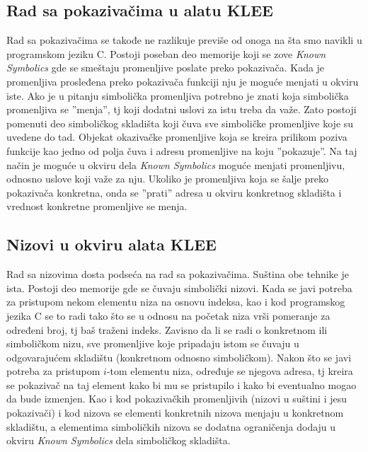 \documentclass[12pt]{article}
\begin{document}
\subsection{Rad sa pokazivačima u alatu KLEE}
Rad sa pokazivačima se takođe ne razlikuje previše od onoga na šta smo navikli u programskom jeziku C. Postoji poseban deo memorije koji se zove \textit{Known Symbolics} gde se smeštaju promenljive poslate preko pokazivača. Kada je promenljiva prosleđena preko pokazivača funkciji nju je moguće menjati u okviru iste. Ako je u pitanju simbolička promenljiva potrebno je znati koja simbolička promenljiva se ''menja'', tj koji dodatni uslovi za istu treba da važe. Zato postoji pomenuti deo simboličkog skladišta koji čuva sve simboličke promenljive koje su uvedene do tad. Objekat okazivačke promenljive koja se kreira prilikom poziva funkcije kao jedno od polja čuva i adresu promenljive na koju ''pokazuje''. Na taj način je moguće u okviru dela \textit{Known Symbolics} moguće menjati promenljivu, odnosno uslove koji važe za nju. Ukoliko je promenljiva koja se šalje preko pokazivača konkretna, onda se ''prati'' adresa u okviru konkretnog skladišta i vrednost konkretne promenljive se menja.
\newpage

\subsection{Nizovi u okviru alata KLEE}
Rad sa nizovima dosta podseća na rad sa pokazivačima. Suština obe tehnike je ista. Postoji deo memorije gde se čuvaju simbolički nizovi. Kada se javi potreba za pristupom nekom elementu niza na osnovu indeksa, kao i kod programskog jezika C se to radi tako što se u odnosu na početak niza vrši pomeranje za određeni broj, tj baš traženi indeks. Zavisno da li se radi o konkretnom ili simboličkom nizu, sve promenljive koje pripadaju istom se čuvaju u odgovarajućem skladištu (konkretnom odnosno simboličkom). Nakon što se javi potreba za pristupom $i$-tom elementu niza, određuje se njegova adresa, tj kreira se pokazivač na taj element kako bi mu se pristupilo i kako bi eventualno mogao da bude izmenjen. Kao i kod pokazivačkih promenljivih (nizovi u suštini i jesu pokazivači) i kod nizova se elementi konkretnih nizova menjaju u konkretnom skladištu, a elementima simboličkih nizova se dodatna ograničenja dodaju u okviru \textit{Known Symbolics} dela simboličkog skladišta.  
\end{document}
